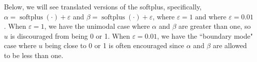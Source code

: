 \documentclass[mnsc,sglanonrev]{informs4}
\begin{document}
Below, we will see translated versions of the softplus, specifically, $\alpha=\operatorname{softplus}(\cdot)+\varepsilon$ and $\beta=\operatorname{softplus}(\cdot)+\varepsilon$, where $\varepsilon = 1$ and where $\varepsilon=0.01$. When $\varepsilon = 1$, we have the unimodal case where $\alpha$ and $\beta$ are greater than one, so $u$ is discouraged from being 0 or 1. When $\varepsilon = 0.01$, we have the ``boundary mode" case where $u$ being close to 0 or 1 is often encouraged since $\alpha$ and $\beta$ are allowed to be less than one. 

%
\end{document}
